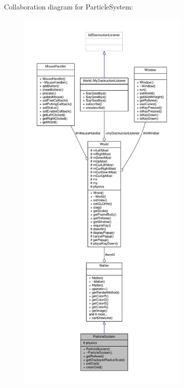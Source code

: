 Collaboration diagram for Particle\+System\+:\nopagebreak
\begin{figure}[H]
\begin{center}
\leavevmode
\includegraphics[height=550pt]{classParticleSystem__coll__graph}
\end{center}
\end{figure}
